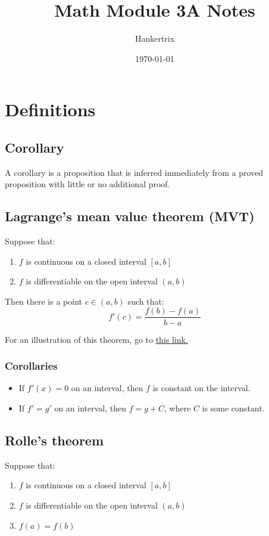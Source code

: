 \documentclass[11pt]{article}
\author{Hankertrix}
\date{\today}
\title{Math Module 3A Notes}
\begin{document}
\maketitle
\setcounter{tocdepth}{2}
\tableofcontents \clearpage\section{Definitions}
\label{sec:org7cc5380}

\subsection{Corollary}
\label{sec:org5b4ad60}
A corollary is a proposition that is inferred immediately from a proved proposition with little or no additional proof.
\subsection{Lagrange's mean value theorem (MVT)}
\label{sec:org4dc6420}
Suppose that:
\begin{enumerate}
\item \(f\) is continuous on a closed interval \([a, b]\)
\item \(f\) is differentiable on the open interval \((a, b)\)
\end{enumerate}

Then there is a point \(c \in (a, b)\) such that:
\[f'(c) = \frac{f(b) - f(a)}{b - a}\]

For an illustration of this theorem, go to \href{https://www.desmos.com/calculator/humyjrcbm4}{this link.}
\subsubsection{Corollaries}
\label{sec:org45fbb0d}
\begin{itemize}
\item If \(f'(x) = 0\) on an interval, then \(f\) is constant on the interval.
\item If \(f' = g'\) on an interval, then \(f = g + C\), where \(C\) is some constant.
\end{itemize}
\subsection{Rolle's theorem}
\label{sec:org27a1932}
Suppose that:
\begin{enumerate}
\item \(f\) is continuous on a closed interval \([a, b]\)
\item \(f\) is differentiable on the open interval \((a, b)\)
\item \(f(a) = f(b)\)
\end{enumerate}
\end{document}
